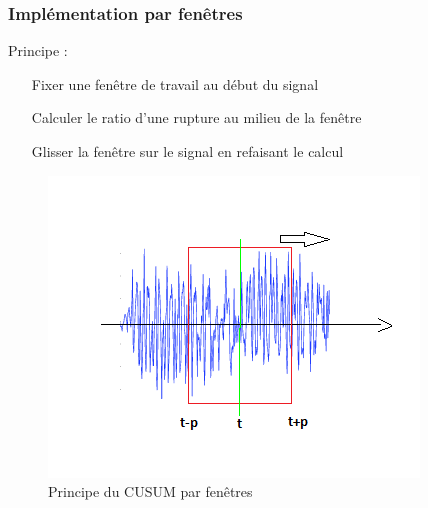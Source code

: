 \documentclass{beamer}
\begin{document}
\begin{frame}

\frametitle{Implémentation par fenêtres}
Principe : %

\begin{itemize}
	\item[Fixer] une fenêtre de travail au début du signal
	\item[Calculer] le ratio d'une rupture au milieu de la fenêtre
	\item[Glisser] la fenêtre sur le signal en refaisant le calcul
\end{itemize}

\begin{figure}
	\includegraphics[scale=0.5]{diagramme_cusum_fen.png}
	\caption{Principe du CUSUM par fenêtres}
\end{figure}



\end{frame}
\end{document}
